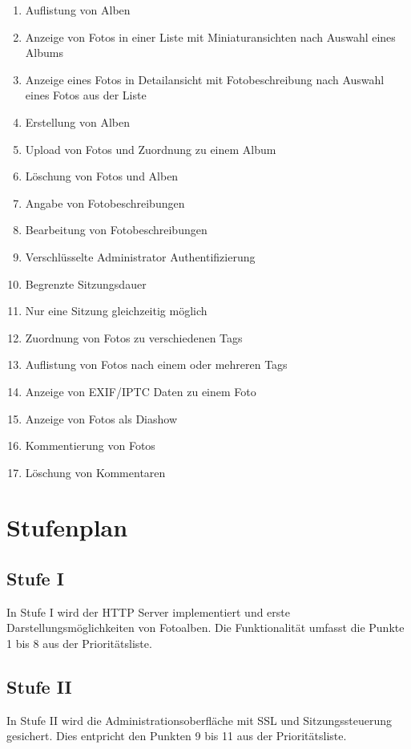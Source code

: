 \documentclass[a4paper,12pt,liststotocnumbered]{scrartcl}
\begin{document}
\begin{enumerate}
	\item Auflistung von Alben
	\item Anzeige von Fotos in einer Liste mit Miniaturansichten nach
		Auswahl eines Albums
	\item Anzeige eines Fotos in Detailansicht mit Fotobeschreibung nach
		Auswahl eines Fotos aus der Liste
	\item Erstellung von Alben
	\item Upload von Fotos und Zuordnung zu einem Album
	\item Löschung von Fotos und Alben
	\item Angabe von Fotobeschreibungen
	\item Bearbeitung von Fotobeschreibungen
	\item Verschlüsselte Administrator Authentifizierung
	\item Begrenzte Sitzungsdauer
	\item Nur eine Sitzung gleichzeitig möglich
	\item Zuordnung von Fotos zu verschiedenen Tags
	\item Auflistung von Fotos nach einem oder mehreren Tags
	\item Anzeige von EXIF/IPTC Daten zu einem Foto
	\item Anzeige von Fotos als Diashow
	\item Kommentierung von Fotos
	\item Löschung von Kommentaren
\end{enumerate}

\section{Stufenplan}

\subsection{Stufe I}

In Stufe I wird der HTTP Server implementiert und erste
Darstellungsmöglichkeiten von Fotoalben. Die Funktionalität umfasst die Punkte
1 bis 8 aus der Prioritätsliste.

\subsection{Stufe II}

In Stufe II wird die Administrationsoberfläche mit SSL und Sitzungssteuerung
gesichert. Dies entpricht den Punkten 9 bis 11 aus der Prioritätsliste.
\end{document}
